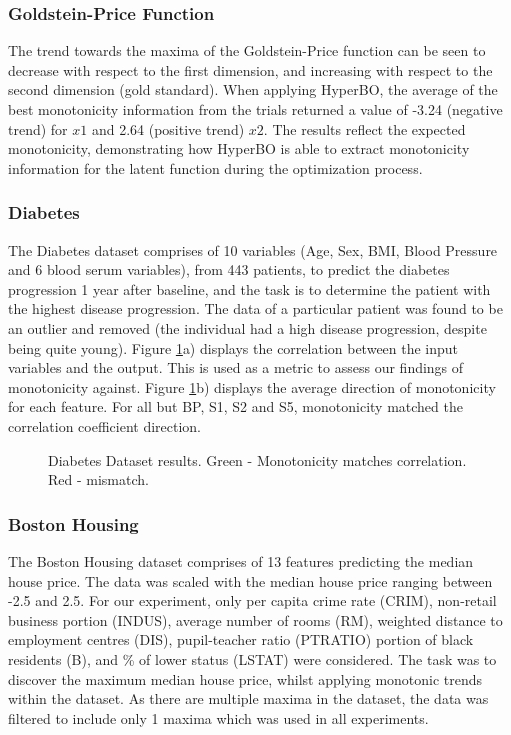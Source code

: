 \documentclass{article}
\begin{document}
\subsubsection{Goldstein-Price Function}
The trend towards the maxima of the Goldstein-Price function can be seen to decrease with respect to the first dimension, and increasing with respect to the second dimension (gold standard). When applying HyperBO, the average of the best monotonicity information from the trials returned a value of -3.24 (negative trend) for $x1$ and 2.64 (positive trend) $x2$. The results reflect the expected monotonicity, demonstrating how HyperBO is able to extract monotonicity information for the latent function during the optimization process.

\subsubsection{Diabetes}
The Diabetes dataset comprises of 10 variables (Age, Sex, BMI, Blood Pressure and 6 blood serum variables), from 443 patients, to predict the diabetes progression 1 year after baseline, and the task is to determine the patient with the highest disease progression.  The data of a particular patient was found to be an outlier and removed (the individual had a high disease progression, despite being quite young). Figure \ref{fig:Diabetes_mono}a) displays the correlation between the input variables and the output. This is used as a metric to assess our findings of monotonicity against. Figure \ref{fig:Diabetes_mono}b) displays the average direction of monotonicity for each feature.  For all but BP, S1, S2 and S5, monotonicity matched the correlation coefficient direction.

\begin{figure}
	\centering
	\qquad
	\caption{Diabetes Dataset results. Green - Monotonicity matches correlation. Red - mismatch.}%
	\label{fig:Diabetes_mono}%
\end{figure}

\subsubsection{Boston Housing}
The Boston Housing dataset comprises of 13 features predicting the  median house price. The data was scaled with the median house price ranging between -2.5 and 2.5. For our experiment, only per capita crime rate (CRIM), non-retail business portion (INDUS), average number of rooms (RM), weighted distance to employment centres (DIS), pupil-teacher ratio (PTRATIO) portion of black residents (B), and \% of lower status (LSTAT)  were considered. The task was to discover the maximum median house price, whilst applying monotonic trends within the dataset. As there are multiple maxima in the dataset, the data was filtered to include only 1 maxima which was used in all experiments.
\end{document}
